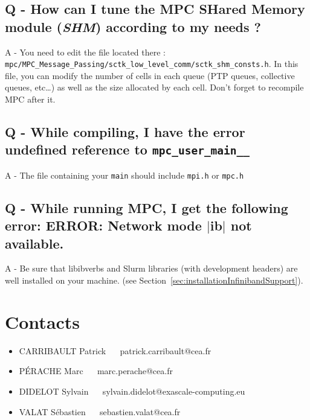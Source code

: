 \documentclass[a4paper,11pt]{article}
\begin{document}
\subsection*{Q - How can I tune the MPC SHared Memory module (\emph{SHM}) according to my needs ?}
A - You need to edit the file located there : \\{\tt mpc/MPC\_Message\_Passing/sctk\_low\_level\_comm/sctk\_shm\_consts.h}. In this file, you can modify the number of cells in each queue (PTP queues, collective queues, etc\dots) as well as the size allocated by each cell. Don't forget to recompile MPC after it.

\subsection*{Q - While compiling, I have the error undefined reference to \texttt{mpc\_user\_main\_\_}}
A - The file containing your \texttt{main} should include \texttt{mpi.h} or \texttt{mpc.h}

\subsection*{Q - While running MPC, I get the following error: ERROR: Network mode $|$ib$|$ not available.}
A - Be sure that libibverbs and Slurm libraries (with development headers) are well installed on your machine. (see Section~\ref{sec:installationInfinibandSupport}).

\section{Contacts}
\begin{itemize}
  \item CARRIBAULT Patrick $\quad$ patrick.carribault@cea.fr
  \item P\'{E}RACHE Marc $\quad$ marc.perache@cea.fr
  \item DIDELOT Sylvain $\quad$ sylvain.didelot@exascale-computing.eu
  \item VALAT S\'{e}bastien $\quad$ sebastien.valat@cea.fr
\end{itemize}


\end{document}
